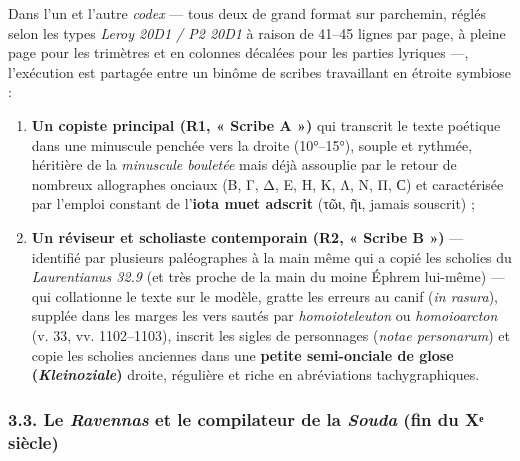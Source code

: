 \documentclass[11pt, a4paper, twoside]{article}
\renewcommand{\_}{\origunderscore\penalty0\relax}
\renewcommand{\texttt}[1]{#1}
\newcommand{\Run}{\textbf{R}\textsuperscript{1}}
\newcommand{\Rdeux}{\textbf{R}\textsuperscript{2}}
\def\Run{R1}%
\def\Rdeux{R2}%
\begin{document}
Dans l'un et l'autre \textit{codex} — tous deux de grand format sur parchemin, réglés selon les types \textit{Leroy 20D1 / P2 20D1} à raison de 41–45 lignes par page, à pleine page pour les trimètres et en colonnes décalées pour les parties lyriques —, l'exécution est partagée entre un binôme de scribes travaillant en étroite symbiose :
\begin{enumerate}[leftmargin=1.6em, itemsep=2pt]
  \item \textbf{Un copiste principal (\Run{}, « Scribe A »)} qui transcrit le texte poétique dans une minuscule penchée vers la droite (10°–15°), souple et rythmée, héritière de la \textit{minuscule bouletée} mais déjà assouplie par le retour de nombreux allographes onciaux (Β, Γ, Δ, Ε, Η, Κ, Λ, Ν, Π, Ϲ) et caractérisée par l'emploi constant de l'\textbf{iota muet adscrit} (\texttt{τῶι}, \texttt{ῆι}, jamais souscrit) ;
  \item \textbf{Un réviseur et scholiaste contemporain (\Rdeux{}, « Scribe B »)} — identifié par plusieurs paléographes à la main même qui a copié les scholies du \textit{Laurentianus 32.9} (et très proche de la main du moine Éphrem lui-même) — qui collationne le texte sur le modèle, gratte les erreurs au canif (\textit{in rasura}), supplée dans les marges les vers sautés par \textit{homoioteleuton} ou \textit{homoioarcton} (\texttt{v. 33}, \texttt{vv. 1102–1103}), inscrit les sigles de personnages (\textit{notae personarum}) et copie les scholies anciennes dans une \textbf{petite semi-onciale de glose (\textit{Kleinoziale})} droite, régulière et riche en abréviations tachygraphiques.
\end{enumerate}


\subsubsection{3.3. Le \textit{Ravennas} et le compilateur de la \textit{Souda} (fin du Xᵉ siècle)}
\end{document}
